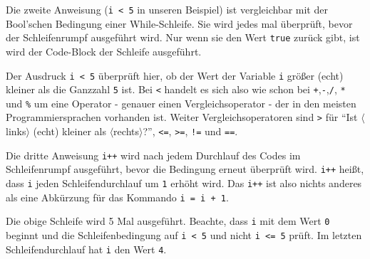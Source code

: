 \begin{Infobox}
	Die zweite Anweisung (\lstinline{i < 5} in unseren Beispiel) ist vergleichbar mit der Bool'schen Bedingung einer While-Schleife.
	Sie wird jedes mal überprüft, bevor der Schleifenrumpf ausgeführt wird.
	Nur wenn sie den Wert \lstinline{true} zurück gibt, ist wird der Code-Block der Schleife ausgeführt.

	Der Ausdruck \lstinline{i < 5} überprüft hier, ob der Wert der Variable \texttt{i} größer (echt) kleiner als die Ganzzahl \texttt{5} ist.
	Bei \texttt{<} handelt es sich also wie schon bei \texttt{+},\texttt{-},\texttt{/}, \texttt{*} und \texttt{\%} um eine Operator - genauer einen Vergleichsoperator - der in den meisten Programmiersprachen vorhanden ist.
	Weiter Vergleichsoperatoren sind \texttt{>} für \enquote{Ist $\langle$links$\rangle$ (echt) kleiner als $\langle$rechts$\rangle$?}, \texttt{<=}, \texttt{>=}, \texttt{!=} und \texttt{==}.

	Die dritte Anweisung \lstinline{i++} wird nach jedem Durchlauf des Codes im Schleifenrumpf ausgeführt, bevor die Bedingung erneut überprüft wird.
	\lstinline{i++} heißt, dass \lstinline{i} jeden Schleifendurchlauf um \lstinline{1} erhöht wird.
	Das \lstinline{i++} ist also nichts anderes als eine Abkürzung für das Kommando \lstinline{i = i + 1}.

	Die obige Schleife wird 5 Mal ausgeführt.
	Beachte, dass \lstinline{i} mit dem Wert \lstinline{0} beginnt und die Schleifenbedingung auf \lstinline{i < 5} und nicht \lstinline{i <= 5} prüft.
	Im letzten Schleifendurchlauf hat \lstinline{i} den Wert \lstinline{4}.
\end{Infobox}


